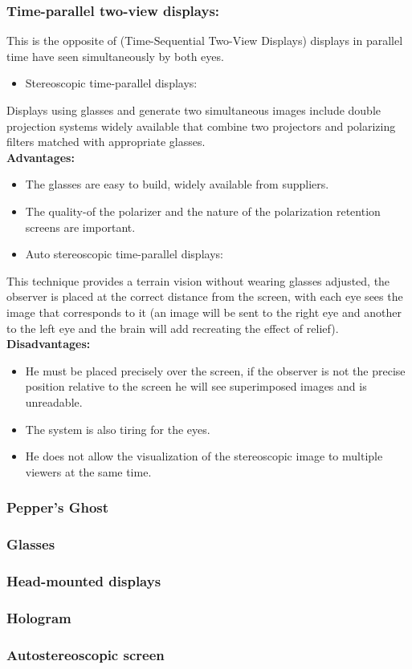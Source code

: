 \subsubsection{Time-parallel two-view displays:}
This is the opposite of (Time-Sequential Two-View Displays) displays in parallel time have seen simultaneously by both eyes.

\begin{itemize}
\item Stereoscopic time-parallel displays:
\end{itemize}
Displays using glasses and generate two simultaneous images include double projection systems widely available that combine two projectors and polarizing filters matched with appropriate glasses.\\
\textbf{Advantages:}
\begin{itemize}
\item The glasses are easy to build, widely available from suppliers.
\item The quality-of the polarizer and the nature of the polarization retention screens are important.
\end{itemize}

\begin{itemize}
\item Auto stereoscopic time-parallel displays:
\end{itemize}
This technique provides a terrain vision without wearing glasses adjusted, the observer is placed at the correct distance from the screen, with each eye sees the image that corresponds to it (an image will be sent to the right eye and another to the left eye and the brain will add recreating the effect of relief).\\
\textbf{Disadvantages:}
\begin{itemize}
\item He must be placed precisely over the screen, if the observer is not the precise position relative to the screen he will see superimposed images and is unreadable.
\item The system is also tiring for the eyes.
\item He does not allow the visualization of the stereoscopic image to multiple viewers at the same time.
\end{itemize}

\subsubsection{Pepper's Ghost}
\subsubsection{Glasses}
\subsubsection{Head-mounted displays}
\subsubsection{Hologram}
\subsubsection{Autostereoscopic screen}
